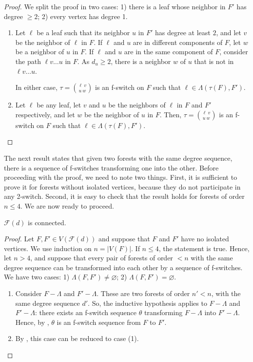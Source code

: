 \documentclass{BICA}
\begin{document}
\begin{proof}
We split the proof in two cases: 1) there is a leaf whose neighbor in $F'$  has degree $\geq 2$; 2) every vertex has degree 1.

\begin{enumerate}[label=(\arabic*).]
	\item Let $\ell$ be a leaf such that its neighbor $u$ in $F'$ has degree at least $2$,  and let $v$ be the neighbor of $\ell$ in $F$. If $\ell$ and $u$ are in different components of $F$, let $w$ be a neighbor of $u$ in $F$. If $\ell$ and $u$ are in the same component of $F$, consider the path $\ell v \ldots u$ in $F$. As $d_u \geq 2$, there is a neighbor $w$ of $u$ that is not in  $\ell v \ldots u$.

	In either case, $\tau={{\ell \ v}\choose{u \ w}}$ is an f-switch on $F$ such that $\ell\in \Lambda(\tau(F),F')$.

	\item Let $\ell$ be any leaf, let $v$ and $u$ be the neighbors of $\ell$ in $F$ and $F'$ respectively,
	and let $w$ be the neighbor of $u$ in $F$.
	Then, $\tau={{\ell \ v}\choose{u \ w}}$ is an f-switch on $F$ such that $\ell\in \Lambda(\tau(F),F')$. \qedhere
\end{enumerate}

\end{proof}

The next result states that given two forests with the same degree sequence, there is a sequence of f-switches transforming one into the other.
Before proceeding with the proof, we need to note two things. First, it is sufficient to prove it for forests without isolated vertices, because they do not participate in any 2-switch. Second, it is easy to check that the result holds for forests of order $n\leq 4$. We are now ready to proceed.

\begin{theorem}
	\label{IPTT}
	$\mathcal{F}(d)$ is connected.

\end{theorem}
\begin{proof}
Let $F,F'\in V(\mathcal{F}(d))$ and suppose that $F$ and $F'$ have no isolated vertices. We use induction on $n=|V(F)|$. If $n\leq 4$, the statement is true. Hence, let $n>4$, and suppose that every pair of forests of order $<n$ with the same degree sequence can be transformed into each other by a sequence of f-switches. We have two cases: 1) $\Lambda(F,F')\neq \varnothing$; 2) $\Lambda(F,F')= \varnothing$.
\begin{enumerate}[label=(\arabic*).]
	\item Consider $F-\Lambda$ and $F'-\Lambda$. These are two forests of order $n'<n$, with the same  degree sequence $d'$. So, the inductive hypothesis applies to $F-\Lambda$ and $F'-\Lambda$: there exists an f-switch sequence $\theta$ transforming $F-\Lambda$ into $F'-\Lambda$. Hence, by , $\theta$ is an f-switch sequence from $F$ to $F'$.

	\item By , this case can be reduced to case (1). \qedhere
\end{enumerate}
\end{proof}
\end{document}
